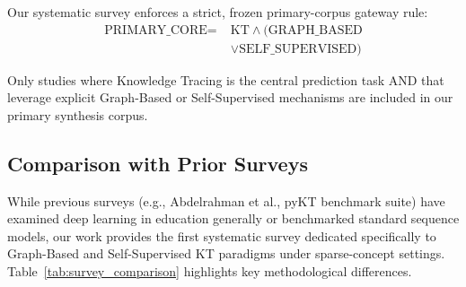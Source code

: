 ﻿\documentclass[10pt,journal,compsoc]{IEEEtran}
\begin{document}
Our systematic survey enforces a strict, frozen primary-corpus gateway rule:
\begin{equation}
\begin{split}
\text{PRIMARY\_CORE} = \; & \text{KT} \land (\text{GRAPH\_BASED} \\
& \lor \text{SELF\_SUPERVISED})
\end{split}
\end{equation}

Only studies where Knowledge Tracing is the central prediction task AND that leverage explicit Graph-Based or Self-Supervised mechanisms are included in our primary synthesis corpus.

\subsection{Comparison with Prior Surveys}
While previous surveys (e.g., Abdelrahman et al., pyKT benchmark suite) have examined deep learning in education generally or benchmarked standard sequence models, our work provides the first systematic survey dedicated specifically to Graph-Based and Self-Supervised KT paradigms under sparse-concept settings. Table~\ref{tab:survey_comparison} highlights key methodological differences.

\begin{table}[t]
\caption{Comparison with Prior Knowledge Tracing Surveys}
\label{tab:survey_comparison}
\centering
{}
\end{table}
\end{document}
